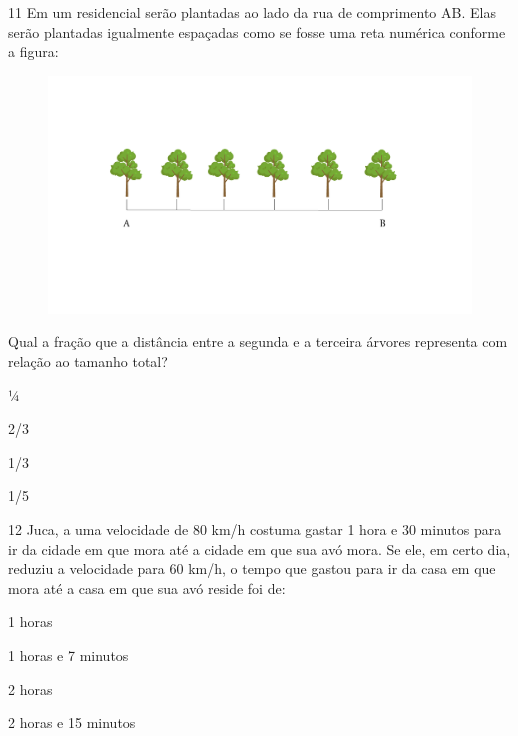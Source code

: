 \num{11} Em um residencial serão plantadas ao lado da rua de comprimento
AB. Elas serão plantadas igualmente espaçadas como se fosse uma reta
numérica conforme a figura:

\begin{figure}[htpb!]
\includegraphics[width=\textwidth]{../ilustracoes/MAT5/SAEB_5ANO_MAT_figura116.png}
\end{figure}

Qual a fração que a distância entre a segunda e a terceira árvores
representa com relação ao tamanho total?

\begin{escolha}
\item
  ¼
\item
  2/3
\item
  1/3
\item
  1/5
\end{escolha}


\num{12} Juca, a uma velocidade de 80 km/h costuma gastar 1 hora e 30
minutos para ir da cidade em que mora até a cidade em que sua avó mora.
Se ele, em certo dia, reduziu a velocidade para 60 km/h, o tempo que
gastou para ir da casa em que mora até a casa em que sua avó reside foi
de:

\begin{escolha}
\item
  1 horas
\item
  1 horas e 7 minutos
\item
  2 horas
\item
  2 horas e 15 minutos
\end{escolha}

